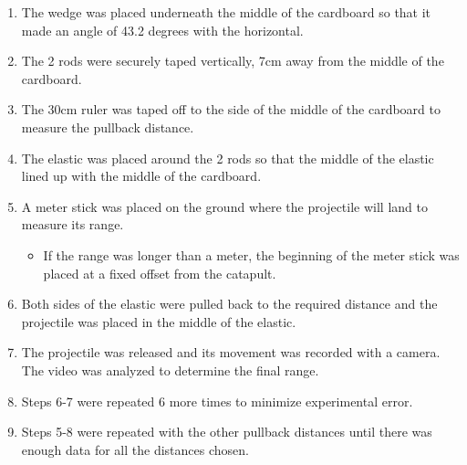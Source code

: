 \begin{enumerate}
    \item The wedge was placed underneath the middle of the cardboard so that it made an angle of 43.2 degrees with the horizontal.
    \item The 2 rods were securely taped vertically, 7cm away from the middle of the cardboard. 
    \item The 30cm ruler was taped off to the side of the middle of the cardboard to measure the pullback distance.
    \item The elastic was placed around the 2 rods so that the middle of the elastic lined up with the middle of the cardboard.
    \item A meter stick was placed on the ground where the projectile will land to measure its range. 
        \begin{itemize}
            \item If the range was longer than a meter, the beginning of the meter stick was placed at a fixed offset from the catapult.
        \end{itemize}
    \item Both sides of the elastic were pulled back to the required distance and the projectile was placed in the middle of the elastic.
    \item The projectile was released and its movement was recorded with a camera. The video was analyzed to determine the final range.
    \item Steps 6-7 were repeated 6 more times to minimize experimental error.
    \item Steps 5-8 were repeated with the other pullback distances until there was enough data for all the distances chosen.
\end{enumerate}
